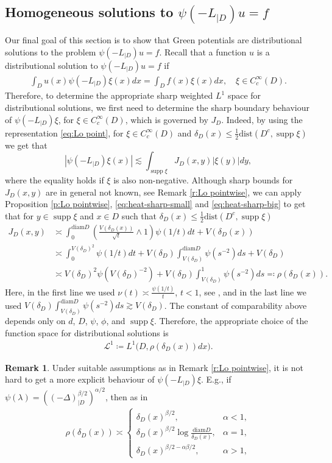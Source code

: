 \documentclass[12pt,a4paper,onecolumn]{article}
\DeclareMathOperator\supp{supp}
\theoremstyle{definition}
\newtheorem{rem}[thm]{Remark}
\newcommand{\1}{\mathbf 1}
\newcommand{\de}{\delta_D}
\newcommand{\calL}{\mathcal{L}^1}
\newcommand{\Lo}{\psi(-L_{|D})}
\newcommand{\INTFR}{\left((-\Delta)^{\beta/2}_{|D}\right)^{\alpha/2}}
\newcommand{\diam}{\textrm{diam}}
\newcommand{\dist}{\textrm{dist}}
\numberwithin{equation}{section}
\begin{document}
    \subsection{Homogeneous solutions to $\Lo u=f$}\label{ss:homo-sol}
    Our final goal of this section is to show that Green potentials are distributional solutions to the problem $\Lo u=f$. Recall that a function $u$ is a distributional solution to $\Lo u=f$ if
	\begin{align}\label{eq:dist-sol}
		\int_D u(x)\Lo \xi(x)dx=\int_D f(x)\xi(x)dx,\quad \xi \in C_c^\infty(D).
	\end{align}
    Therefore, to determine the appropriate sharp weighted $L^1$ space for distributional solutions, we first need to determine the sharp boundary behaviour of $\Lo \xi$, for $\xi \in C_c^\infty(D)$, which is governed by $J_D$. Indeed, by using the representation \eqref{eq:Lo point}, for $\xi \in C_c^\infty(D)$ and  $\de(x)\le \frac12\dist(D^c,\supp \xi)$ we get that
	$$ |\Lo \xi(x)|\lesssim \int_{\supp \xi}J_D(x,y)|\xi(y)|dy,$$
    where the equality holds if $\xi$ is also non-negative.
Although sharp bounds for $J_D(x,y)$ are in general not known, see Remark \ref{r:Lo pointwise}, we can apply Proposition \ref{p:Lo pointwise}, \eqref{eq:heat-sharp-small} and \eqref{eq:heat-sharp-big} to get that for $y\in \supp \xi$ and $x\in D$ such that $\de(x)\le \frac12\dist(D^c,\supp \xi)$
    \begin{align}\label{eq:dist-weight-rho}
		J_D(x,y)&\asymp \int_0^{ \diam D} \left(\frac{V(\de(x))}{\sqrt{t}}\wedge 1\right)\psi(1/t) dt+V(\de(x))\nonumber\\
    &\asymp \int_0^{V(\de)^2}\psi(1/t)dt+V(\de)\int_{V(\de)}^{\diam D}\psi(s^{-2})ds+V(\de)\nonumber\\
    &\asymp V(\de)^2\psi(V(\de)^{-2})+V(\de)\int_{V(\de)}^1\psi(s^{-2})ds\eqqcolon \rho(\de(x)).
	\end{align}
    Here, in the first line we used $\nu(t)\asymp \frac{\psi(1/t)}{t}$, $t<1$, see \cite[Corollary 2.5 \& Proposition 2.6]{KSV14-gubhp-spa}, and in the last line we used  $V(\de)\int_{V(\de)}^{ \diam D}\psi(s^{-2})ds\gtrsim V(\de)$. The constant of comparability above depends only on $d$, $D$, $\psi$, $\phi$, and $\supp \xi$.   
    Therefore, the appropriate choice of the function space for distributional solutions is
    \begin{align*}
        \calL\coloneqq L^1\big(D,\rho(\de(x))dx\big).
    \end{align*}
    \begin{rem}
        Under	suitable assumptions as in Remark \ref{r:Lo pointwise}, it is not hard to  get a more explicit behaviour of $\Lo \xi$. E.g., if
	$\psi(\lambda)=\INTFR$, then as in \cite[Example 8.5]{ksv2020boundary}
	\begin{align*}
		\rho(\de(x))\asymp  \begin{cases}
		\de(x)^{\beta/2}, &\alpha<1,\\
		\de(x)^{\beta/2}\log\frac{\diam D}{\de(x)},&\alpha=1,\\
		\de(x)^{\beta/2-\alpha\beta/2},&\alpha>1,
		\end{cases}
	\end{align*}
    \end{rem}
\end{document}
